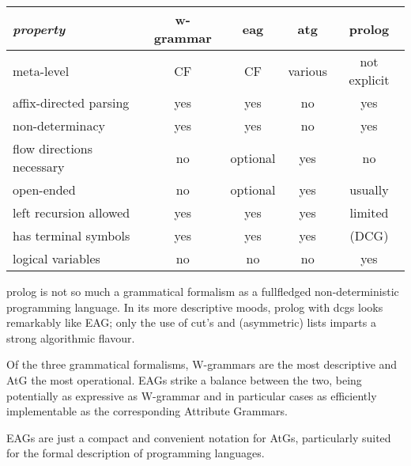 \noindent
\begin{tabular}{lcccc}
{\em property} & {\sc w-grammar} & {\sc eag} & {\sc atg} & {\sc prolog} \\ \hline
meta-level & CF & CF & various & not explicit \\
affix-directed parsing & yes & yes & no & yes \\
non-determinacy & yes & yes & no & yes \\
flow directions necessary & no & optional & yes & no \\
open-ended & no & optional & yes & usually \\
left recursion allowed & yes & yes & yes & limited \\
has terminal symbols & yes & yes & yes & (DCG) \\
logical variables & no & no & no & yes 
\end{tabular}

\vspace{.5cm}
{\sc prolog} is not so much a grammatical formalism as a fullfledged
non-determinis\-tic
programming language. In its more descriptive moods, {\sc prolog} with
{\sc dcg}s looks remarkably like EAG; only the use of cut's and
(asymmetric) lists imparts a strong algorithmic flavour.

Of the three grammatical formalisms, W-grammars
are the most descriptive and AtG the most operational. EAGs strike a
balance between the two, being potentially as expressive as W-grammar and
in particular cases as efficiently implementable as the corresponding
Attribute Grammars.

EAGs are just a compact and convenient notation for AtGs, particularly
suited for the formal description of programming languages.


